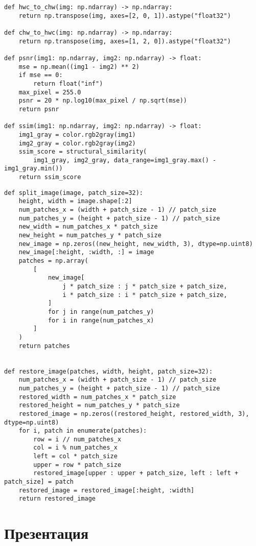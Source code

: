 \begin{appendices}
\begin{lstlisting}[caption={Модуль со вспомогательными утилитами (часть 1)}]
def hwc_to_chw(img: np.ndarray) -> np.ndarray:
    return np.transpose(img, axes=[2, 0, 1]).astype("float32")

def chw_to_hwc(img: np.ndarray) -> np.ndarray:
    return np.transpose(img, axes=[1, 2, 0]).astype("float32")

def psnr(img1: np.ndarray, img2: np.ndarray) -> float:
    mse = np.mean((img1 - img2) ** 2)
    if mse == 0:
        return float("inf")
    max_pixel = 255.0
    psnr = 20 * np.log10(max_pixel / np.sqrt(mse))
    return psnr

def ssim(img1: np.ndarray, img2: np.ndarray) -> float:
    img1_gray = color.rgb2gray(img1)
    img2_gray = color.rgb2gray(img2)
    ssim_score = structural_similarity(
        img1_gray, img2_gray, data_range=img1_gray.max() - img1_gray.min())
    return ssim_score
\end{lstlisting}
\clearpage

\begin{lstlisting}[caption={Модуль со вспомогательными утилитами (часть 2)}]
def split_image(image, patch_size=32):
    height, width = image.shape[:2]
    num_patches_x = (width + patch_size - 1) // patch_size
    num_patches_y = (height + patch_size - 1) // patch_size
    new_width = num_patches_x * patch_size
    new_height = num_patches_y * patch_size
    new_image = np.zeros((new_height, new_width, 3), dtype=np.uint8)
    new_image[:height, :width, :] = image
    patches = np.array(
        [
            new_image[
                j * patch_size : j * patch_size + patch_size,
                i * patch_size : i * patch_size + patch_size,
            ]
            for j in range(num_patches_y)
            for i in range(num_patches_x)
        ]
    )
    return patches


def restore_image(patches, width, height, patch_size=32):
    num_patches_x = (width + patch_size - 1) // patch_size
    num_patches_y = (height + patch_size - 1) // patch_size
    restored_width = num_patches_x * patch_size
    restored_height = num_patches_y * patch_size
    restored_image = np.zeros((restored_height, restored_width, 3), dtype=np.uint8)
    for i, patch in enumerate(patches):
        row = i // num_patches_x
        col = i % num_patches_x
        left = col * patch_size
        upper = row * patch_size
        restored_image[upper : upper + patch_size, left : left + patch_size] = patch
    restored_image = restored_image[:height, :width]
    return restored_image
\end{lstlisting}

\chapter{Презентация}

\end{appendices}